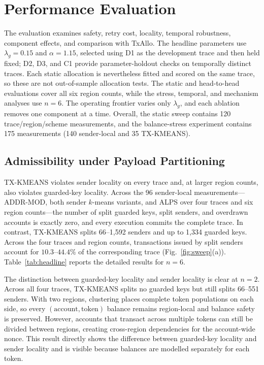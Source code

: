 \documentclass[runningheads]{llncs}
\begin{document}
\section{Performance Evaluation}
\label{sec:results}

The evaluation examines safety, retry cost, locality, temporal robustness,
component effects, and comparison with TxAllo. The headline parameters use
$\lambda_g=0.15$ and $\alpha=1.15$, selected using D1 as the development trace
and then held fixed; D2, D3, and C1 provide parameter-holdout checks on
temporally distinct traces. Each static allocation is nevertheless fitted and
scored on the same trace, so these are not out-of-sample allocation tests.
The static and head-to-head evaluations cover all six region counts, while the
stress, temporal, and mechanism analyses use $n=6$. The operating frontier
varies only $\lambda_g$, and each ablation removes one component at a time.
Overall, the static sweep contains 120 trace/region/scheme measurements, and the
balance-stress experiment contains 175 measurements (140 sender-local and 35
TX-KMEANS).

\subsection{Admissibility under Payload Partitioning}

TX-KMEANS violates sender locality on every trace and, at larger region
counts, also violates guarded-key locality. Across the 96 sender-local
measurements---ADDR-MOD, both sender $k$-means variants, and ALPS over four
traces and six region counts---the number of split guarded keys, split senders,
and overdrawn accounts is exactly zero, and every execution commits the complete
trace. In contrast, TX-KMEANS splits 66--1{,}592 senders and up to 1{,}334
guarded keys. Across the four traces and region counts, transactions issued by
split senders account for $10.3$--$44.4\%$ of the corresponding trace
(Fig.~\ref{fig:sweep}(a)). Table~\ref{tab:headline} reports the detailed results
for $n=6$.

The distinction between guarded-key locality and sender locality is clear at
$n=2$. Across all four traces, TX-KMEANS splits no guarded keys but still splits
66--551 senders. With two regions, clustering places complete token populations
on each side, so every $(\text{account},\text{token})$ balance remains
region-local and balance safety is preserved. However, accounts that transact
across multiple tokens can still be divided between regions, creating
cross-region dependencies for the account-wide nonce. This result directly
shows the difference between guarded-key locality and sender locality and is
visible because balances are modelled separately for each token.
\end{document}
